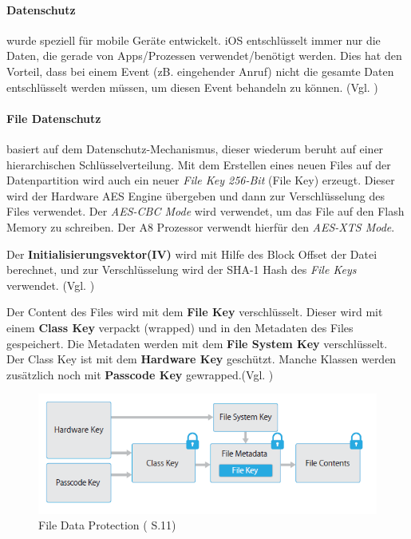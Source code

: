 \paragraph{Datenschutz} wurde speziell für mobile Geräte entwickelt. iOS entschlüsselt immer nur die Daten, die gerade von Apps/Prozessen verwendet/benötigt werden. Dies hat den Vorteil, dass bei einem Event (zB. eingehender Anruf) nicht die gesamte Daten entschlüsselt werden müssen, um diesen Event behandeln zu können. (Vgl. \cite{Apple[4]})

\paragraph{File Datenschutz} basiert auf dem Datenschutz-Mechanismus, dieser wiederum beruht auf einer hierarchischen Schlüsselverteilung. Mit dem Erstellen eines neuen Files auf der Datenpartition wird auch ein neuer \textit{\glqq File Key 256-Bit\grqq{}} (\glqq File Key\grqq) erzeugt. Dieser wird der Hardware AES Engine übergeben und dann zur Verschlüsselung des Files verwendet.  Der \textit{\glqq AES-CBC Mode\grqq{}} wird verwendet, um das File auf den Flash Memory zu schreiben. Der A8 Prozessor verwendt hierfür den \textit{\glqq AES-XTS Mode\grqq{}}.  \par
Der \textbf{Initialisierungsvektor(IV)} wird mit Hilfe des Block Offset der Datei berechnet, und zur Verschlüsselung wird der SHA-1 Hash des \textit{\glqq File Keys\grqq{}} verwendet. (Vgl. \cite{iOSSec[5], iOSSec[2],iOSSec[1], Apple[4], Apple[5], Apple[6], Apple[3]})

Der Content des Files wird mit dem \textbf{File Key} verschlüsselt. Dieser wird mit einem \textbf{Class Key} verpackt (wrapped) und in den Metadaten des Files gespeichert. Die Metadaten werden mit dem \textbf{File System Key} verschlüsselt. Der Class Key ist mit dem \textbf{Hardware Key} geschützt. Manche Klassen werden zusätzlich noch mit \textbf{Passcode Key} gewrapped.(Vgl. \cite{iOSSec[5], iOSSec[2],iOSSec[1], Apple[4], Apple[5], Apple[6], Apple[3]})
\begin{figure}[hp!]
        \centering
        \includegraphics[scale=0.75]{fileDataProtection.PNG}
        \caption{File Data Protection (\cite{Apple[4]} S.11)}
        \label{fig:FileDataProtection}
\end{figure}

